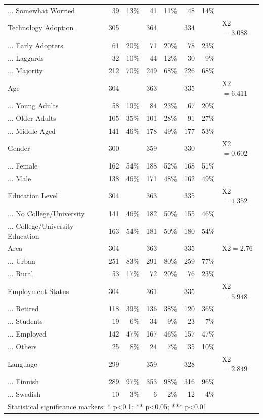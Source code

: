 \begin{table}[!htbp]
{\begin{tabular}{lrrrrrrl}
... Somewhat Worried & 39 & 13\% & 41 & 11\% & 48 & 14\% &  \\ 
Technology Adoption & 305 &  & 364 &  & 334 &  & X2$=3.088^{}$ \\ 
... Early Adopters & 61 & 20\% & 71 & 20\% & 78 & 23\% &  \\ 
... Laggards & 32 & 10\% & 44 & 12\% & 30 & 9\% &  \\ 
... Majority & 212 & 70\% & 249 & 68\% & 226 & 68\% &  \\ 
Age & 304 &  & 363 &  & 335 &  & X2$=6.411^{}$ \\ 
... Young Adults & 58 & 19\% & 84 & 23\% & 67 & 20\% &  \\ 
... Older Adults & 105 & 35\% & 101 & 28\% & 91 & 27\% &  \\ 
... Middle-Aged & 141 & 46\% & 178 & 49\% & 177 & 53\% &  \\ 
Gender & 300 &  & 359 &  & 330 &  & X2$=0.602^{}$ \\ 
... Female & 162 & 54\% & 188 & 52\% & 168 & 51\% &  \\ 
... Male & 138 & 46\% & 171 & 48\% & 162 & 49\% &  \\ 
Education Level & 304 &  & 363 &  & 335 &  & X2$=1.352^{}$ \\ 
... No College/University & 141 & 46\% & 182 & 50\% & 155 & 46\% &  \\ 
... College/University Education & 163 & 54\% & 181 & 50\% & 180 & 54\% &  \\ 
Area & 304 &  & 363 &  & 335 &  & X2$=2.76^{}$ \\ 
... Urban & 251 & 83\% & 291 & 80\% & 259 & 77\% &  \\ 
... Rural & 53 & 17\% & 72 & 20\% & 76 & 23\% &  \\ 
Employment Status & 304 &  & 361 &  & 335 &  & X2$=5.948^{}$ \\ 
... Retired & 118 & 39\% & 136 & 38\% & 120 & 36\% &  \\ 
... Students & 19 & 6\% & 34 & 9\% & 23 & 7\% &  \\ 
... Employed & 142 & 47\% & 167 & 46\% & 157 & 47\% &  \\ 
... Others & 25 & 8\% & 24 & 7\% & 35 & 10\% &  \\ 
Language & 299 &  & 359 &  & 328 &  & X2$=2.849^{}$ \\ 
... Finnish & 289 & 97\% & 353 & 98\% & 316 & 96\% &  \\ 
... Swedish & 10 & 3\% & 6 & 2\% & 12 & 4\% & \\ 
\hline
\hline
\multicolumn{8}{l}{Statistical significance markers: * p<0.1; ** p<0.05; *** p<0.01}\\ 
\end{tabular}
}
\end{table}



